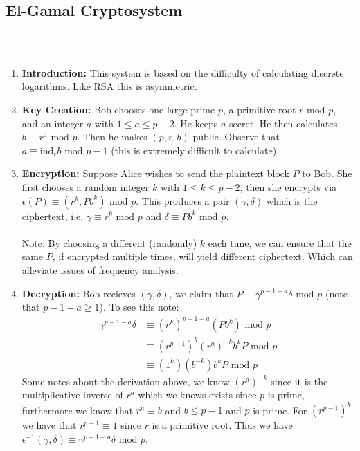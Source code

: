 \documentclass[class=article, crop=false]{standalone}
\def\ind{{\text{ind}}}
\begin{document}
\subsection{El-Gamal Cryptosystem}
\rule{\textwidth}{1pt}\\
\begin{enumerate}
	\item \textbf{Introduction:}
	This system is based on the difficulty of calculating discrete logarithms.
	Like RSA this is asymmetric.

	\item \textbf{Key Creation:}
	Bob chooses one large prime $p$, a primitive root $r\mbox{ mod }p$,
	and an integer $a$ with $1\leq a\leq p-2$. He keeps $a$ secret.
	He then calculates $b\equiv r^a\mbox{ mod }p$. Then he makes $(p, r, b)$
	public. Observe that $a\equiv \ind_r b\mbox{ mod }p-1$ (this is
	extremely difficult to calculate).

	\item \textbf{Encryption:}
	Suppose Alice wishes to send the plaintext block $P$ to Bob.
	She first chooses a random integer $k$ with $1\leq k\leq p-2$,
	then she encrypts via $\epsilon(P)\equiv (r^k, Pb^k)\mbox{ mod }p$.
	This produces a pair $(\gamma ,\delta)$ which is the ciphertext,
	i.e. $\gamma\equiv r^k\mbox{ mod }p$ and $\delta\equiv Pb^k\mbox{ mod }p$. \\\\
	Note: By choosing a different (randomly) $k$ each time,
	we can ensure that the same $P$, if encrypted multiple times,
	will yield different ciphertext. Which can alleviate issues of
	frequency analysis.

	\item \textbf{Decryption:}
	Bob recieves $(\gamma, \delta)$, we claim that $P\equiv \gamma^{p-1-a}\delta\mbox{ mod }p$
	(note that $p-1-a\geq 1$). To see this note:
	\begin{align*}
		\gamma^{p-1-a}\delta &\equiv (r^k)^{p-1-a}(Pb^k)\mbox{ mod }p \\
		&\equiv (r^{p-1})^k(r^a)^{-k}b^k P \mbox{ mod }p \\
		&\equiv (1^k)(b^{-k})b^k P\mbox{ mod }p
	\end{align*}
	Some notes about the derivation above, we know $(r^a)^{-k}$ since it is the
	multiplicative inverse of $r^a$ which we knows exists since $p$ is prime,
	furthermore we know that $r^a\equiv b$ and $b\leq p-1$ and $p$ is prime.
	For $(r^{p-1})^k$ we have that $r^{p-1}\equiv 1$ since $r$ is a primitive root. 
	Thus we have $\epsilon^{-1}(\gamma, \delta) \equiv \gamma^{p-1-a}\delta\mbox{ mod }p$.


\end{enumerate}
\end{document}
